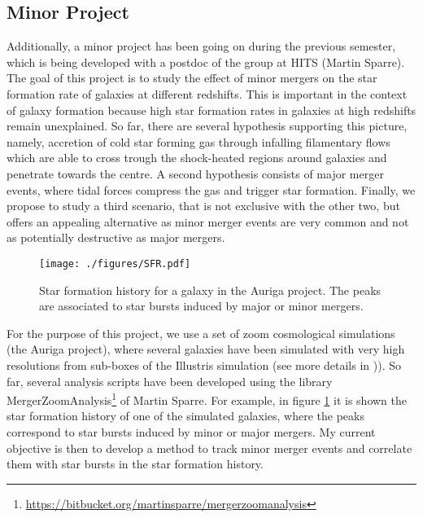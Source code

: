 \documentclass[a4,useAMS,usenatbib,usegraphicx,12pt]{article}
\begin{document}
\newpage
\subsection{Minor Project}

Additionally, a minor project has been going on during the previous semester, 
which is being developed with a postdoc of the group at HITS (Martin Sparre).
The goal of this project is to study the effect of minor mergers on the
star formation rate of galaxies at different redshifts. This is important in
the context of galaxy formation because high star formation rates in galaxies 
at high redshifts remain unexplained. So far, there are several hypothesis 
supporting this picture, namely, accretion of cold star forming gas through 
infalling filamentary flows which are able to cross trough the shock-heated 
regions around galaxies and penetrate towards the centre. A second hypothesis 
consists of major merger events, where tidal forces compress the gas and 
trigger star formation. Finally, we propose to study a third scenario, that is 
not exclusive with the other two, but offers an appealing alternative as minor 
merger events are very common and not as potentially destructive as major 
mergers.

\begin{figure}[!htbp]
\centering

  \texttt{[image: ./figures/SFR.pdf]}
  
  \caption{\small Star formation history for a galaxy in the Auriga project.
  The peaks are associated to star bursts induced by major or minor mergers.}

  \label{fig:SFR}

\end{figure}

For the purpose of this project, we use a set of zoom cosmological simulations 
(the Auriga project), where several galaxies have been simulated with very high
resolutions from sub-boxes of the Illustris simulation (see more details in
\citet{Grand16})). So far, several analysis scripts have been developed using 
the library MergerZoomAnalysis\footnote{
\url{https://bitbucket.org/martinsparre/mergerzoomanalysis}} of Martin Sparre. 
For example, in figure \ref{fig:SFR} it is shown the star formation history of 
one of the simulated galaxies, where the peaks correspond to star bursts induced 
by minor or major mergers. My current objective is then to develop a method to 
track minor merger events and correlate them with star bursts in the star 
formation history.



\renewcommand{\bibname}{8\ \ \ \ Bibliography}
\small

\end{document}
